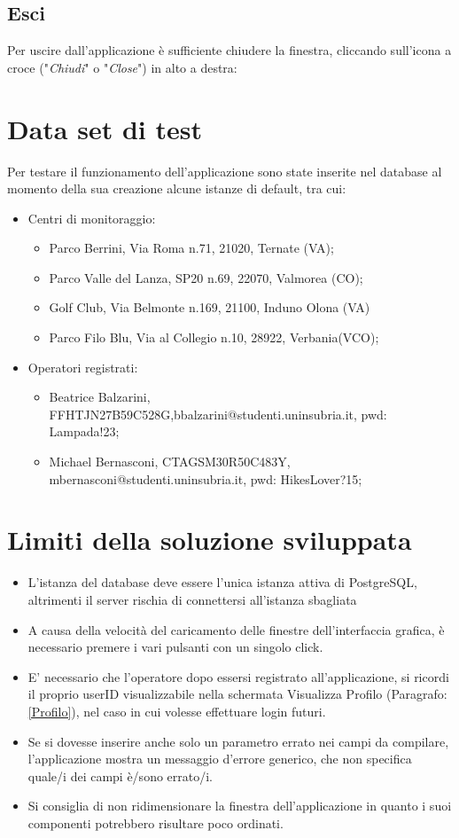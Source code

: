 \section{Esci}
Per uscire dall'applicazione è sufficiente chiudere la finestra, cliccando sull'icona a croce ("\textit{Chiudi}" o "\textit{Close}") in alto a destra:

\chapter{Data set di test}
Per testare il funzionamento dell'applicazione sono state inserite nel database al momento della sua creazione alcune istanze di default, tra cui:
\begin{itemize}
	\item Centri di monitoraggio:
	\begin{itemize}
		\item Parco Berrini, Via Roma n.71, 21020, Ternate (VA);
		\item Parco Valle del Lanza, SP20 n.69, 22070, Valmorea (CO);
		\item Golf Club, Via Belmonte n.169, 21100, Induno Olona (VA)
		\item Parco Filo Blu, Via al Collegio n.10,
		28922, Verbania(VCO);
	\end{itemize}
	\item Operatori registrati:
	\begin{itemize}
		\item Beatrice Balzarini, FFHTJN27B59C528G,bbalzarini@studenti.uninsubria.it, pwd: Lampada!23;
		\item Michael Bernasconi, CTAGSM30R50C483Y, mbernasconi@studenti.uninsubria.it, pwd: HikesLover?15;
	\end{itemize}
\end{itemize}



\chapter{Limiti della soluzione sviluppata}
\begin{itemize}
	\item L'istanza del database deve essere l'unica istanza attiva di PostgreSQL, altrimenti il server rischia di connettersi all'istanza sbagliata
	\item A causa della velocità del caricamento delle finestre dell'interfaccia grafica, è necessario premere i vari pulsanti con un singolo click.
	\item E' necessario che l'operatore dopo essersi registrato all'applicazione, si ricordi il proprio userID visualizzabile nella schermata Visualizza Profilo (Paragrafo:\ref{Profilo}), nel caso in cui volesse effettuare login futuri.  
	\item Se si dovesse inserire anche solo un parametro errato nei campi da compilare, l'applicazione mostra un messaggio d'errore generico, che non specifica quale/i dei campi è/sono errato/i.
	\item Si consiglia di non ridimensionare la finestra dell'applicazione in quanto i suoi componenti potrebbero risultare poco ordinati.
\end{itemize}

\nocite{IuriTex}


